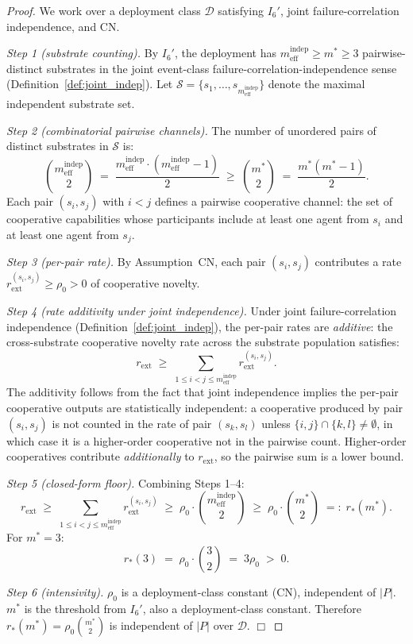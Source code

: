 \documentclass{article}
\newcommand{\rext}{r_{\mathrm{ext}}}
\newcommand{\mindep}{m_{\mathrm{eff}}^{\mathrm{indep}}}
\begin{document}
\begin{proof}
We work over a deployment class $\mathcal{D}$ satisfying $I_6'$,
joint failure-correlation independence, and CN.

\emph{Step 1 (substrate counting).}  By $I_6'$, the deployment has
$\mindep \geq m^* \geq 3$ pairwise-distinct substrates in the joint
event-class failure-correlation-independence sense
(Definition~\ref{def:joint_indep}).  Let $\mathcal{S} = \{s_1,
\ldots, s_{\mindep}\}$ denote the maximal independent substrate set.

\emph{Step 2 (combinatorial pairwise channels).}  The number of
unordered pairs of distinct substrates in $\mathcal{S}$ is:
\[
  \binom{\mindep}{2} \;=\; \frac{\mindep \cdot (\mindep - 1)}{2}
  \;\geq\; \binom{m^*}{2}
  \;=\; \frac{m^* (m^* - 1)}{2}.
\]
Each pair $(s_i, s_j)$ with $i < j$ defines a pairwise cooperative
channel: the set of cooperative capabilities whose participants
include at least one agent from $s_i$ and at least one agent from
$s_j$.

\emph{Step 3 (per-pair rate).}  By Assumption~CN, each pair
$(s_i, s_j)$ contributes a rate $\rext^{(s_i, s_j)} \geq \rho_0 >
0$ of cooperative novelty.

\emph{Step 4 (rate additivity under joint independence).}  Under
joint failure-correlation independence
(Definition~\ref{def:joint_indep}), the per-pair rates are
\emph{additive}: the cross-substrate cooperative novelty rate
across the substrate population satisfies:
\[
  \rext \;\geq\; \sum_{1 \leq i < j \leq \mindep}
  \rext^{(s_i, s_j)}.
\]
The additivity follows from the fact that joint independence
implies the per-pair cooperative outputs are statistically
independent: a cooperative produced by pair $(s_i, s_j)$ is not
counted in the rate of pair $(s_k, s_l)$ unless $\{i, j\} \cap \{k,
l\} \neq \emptyset$, in which case it is a higher-order cooperative
not in the pairwise count.  Higher-order cooperatives contribute
\emph{additionally} to $\rext$, so the pairwise sum is a lower
bound.

\emph{Step 5 (closed-form floor).}  Combining Steps 1--4:
\[
  \rext \;\geq\; \sum_{1 \leq i < j \leq \mindep} \rext^{(s_i, s_j)}
  \;\geq\; \rho_0 \cdot \binom{\mindep}{2}
  \;\geq\; \rho_0 \cdot \binom{m^*}{2}
  \;=:\; r_*(m^*).
\]
For $m^* = 3$:
\[
  r_*(3) \;=\; \rho_0 \cdot \binom{3}{2} \;=\; 3 \rho_0 \;>\; 0.
\]

\emph{Step 6 (intensivity).}  $\rho_0$ is a deployment-class
constant (CN), independent of $|P|$.  $m^*$ is the threshold from
$I_6'$, also a deployment-class constant.  Therefore $r_*(m^*) =
\rho_0 \binom{m^*}{2}$ is independent of $|P|$ over $\mathcal{D}$.
$\Box$
\end{proof}
\end{document}
